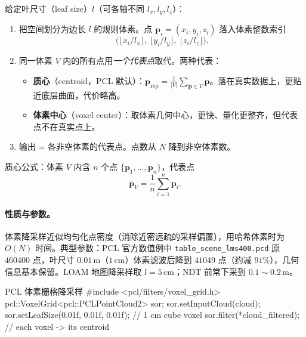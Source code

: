 \begin{algo}[体素栅格降采样]\label{alg:pc-voxel}
给定叶尺寸（leaf size）$l$（可各轴不同 $l_x,l_y,l_z$）：
\begin{enumerate}
  \item 把空间划分为边长 $l$ 的规则体素。点 $\mathbf{p}_i=(x_i,y_i,z_i)$ 落入体素整数索引
  \begin{equation}
    \big(\lfloor x_i/l_x\rfloor,\ \lfloor y_i/l_y\rfloor,\ \lfloor z_i/l_z\rfloor\big).
    \label{eq:pc-voxel-index}
  \end{equation}
  \item 同一体素 $V$ 内的所有点用\emph{一个代表点}取代。两种代表：
  \begin{itemize}
    \item \textbf{质心}（centroid，PCL 默认）：$\displaystyle\mathbf{p}_{\text{rep}}=\frac{1}{|V|}\sum_{\mathbf{p}\in V}\mathbf{p}$。落在真实数据上，更贴近底层曲面，代价略高。
    \item \textbf{体素中心}（voxel center）：取体素几何中心，更快、量化更整齐，但代表点不在真实点上。
  \end{itemize}
  \item 输出 = 各非空体素的代表点。点数从 $N$ 降到非空体素数。
\end{enumerate}
质心公式：体素 $V$ 内含 $n$ 个点 $\{\mathbf{p}_1,\dots,\mathbf{p}_n\}$，代表点
\begin{equation}
  \bar{\mathbf{p}}_V=\frac{1}{n}\sum_{i=1}^{n}\mathbf{p}_i.
  \label{eq:pc-centroid}
\end{equation}
\end{algo}

\paragraph{性质与参数。}
体素降采样近似均匀化点密度（消除近密远疏的采样偏置），用哈希体素时为 $O(N)$ 时间\cite{magnusson2009ndt}。典型参数：PCL 官方数值例中 \texttt{table\_scene\_lms400.pcd} 原 $460400$ 点，叶尺寸 $0.01\,\mathrm{m}$（$1\,\mathrm{cm}$）体素滤波后降到 $41049$ 点（约减 $91\%$），几何信息基本保留\cite{rusu2011pcl}。LOAM 地图降采样取 $l=5\,\mathrm{cm}$\cite{zhang2014loam}；NDT 前常下采到 $0.1\sim0.2\,\mathrm{m}$\cite{magnusson2009ndt}。

\begin{codebox}[C++]{PCL 体素栅格降采样}
#include <pcl/filters/voxel_grid.h>
pcl::VoxelGrid<pcl::PCLPointCloud2> sor;
sor.setInputCloud(cloud);
sor.setLeafSize(0.01f, 0.01f, 0.01f);   // 1 cm cube voxel
sor.filter(*cloud_filtered);            // each voxel -> its centroid
\end{codebox}

